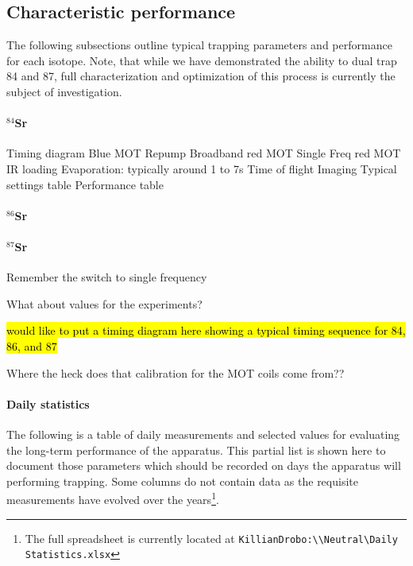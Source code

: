 \subsection{Characteristic performance} \label{sec:benchmark_trapping}

The following subsections outline typical trapping parameters and performance for each isotope. Note, that while we have demonstrated the ability to dual trap 84 and 87, full characterization and optimization of this process is currently the subject of investigation.

\paragraph{$^{84}$Sr} \label{sec:84_trapping}

Timing diagram
	Blue MOT
	Repump
	Broadband red MOT
	Single Freq red MOT
	IR loading
	Evaporation: typically around 1 to 7s
	Time of flight
	Imaging
Typical settings table
Performance table

\paragraph{$^{86}$Sr} \label{sec:86_trapping}

\paragraph{$^{87}$Sr} \label{sec:87_trapping}


Remember the switch to single frequency

What about values for the experiments?

\hl{would like to put a timing diagram here showing a typical timing sequence for 84, 86, and 87}

Where the heck does that calibration for the MOT coils come from??

\paragraph{Daily statistics} \label{sec:dailyStats}
The following is a table of daily measurements and selected values for evaluating the long-term performance of the apparatus.
This partial list is shown here to document those parameters which should be recorded on days the apparatus will performing trapping.
Some columns do not contain data as the requisite measurements have evolved over the years\footnote{The full spreadsheet is currently located at \texttt{KillianDrobo:\textbackslash\textbackslash Neutral\textbackslash Daily Statistics.xlsx}}.

